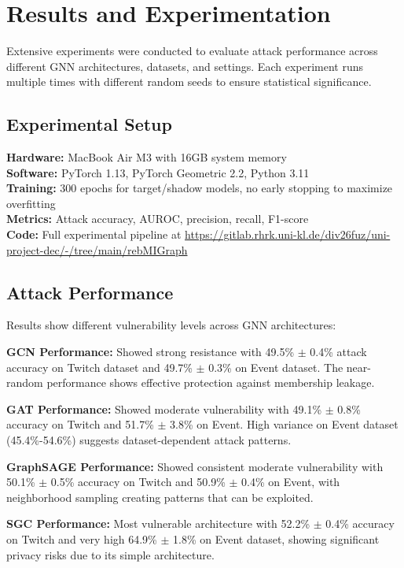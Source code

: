 \documentclass{article}
\begin{document}
\section{Results and Experimentation}
\label{results}
Extensive experiments were conducted to evaluate attack performance across different GNN architectures, datasets, and settings. Each experiment runs multiple times with different random seeds to ensure statistical significance.

\subsection{Experimental Setup}
\textbf{Hardware:} MacBook Air M3 with 16GB system memory\\
\textbf{Software:} PyTorch 1.13, PyTorch Geometric 2.2, Python 3.11\\
\textbf{Training:} 300 epochs for target/shadow models, no early stopping to maximize overfitting\\
\textbf{Metrics:} Attack accuracy, AUROC, precision, recall, F1-score\\
\textbf{Code:} Full experimental pipeline at \url{https://gitlab.rhrk.uni-kl.de/div26fuz/uni-project-dec/-/tree/main/rebMIGraph}

\subsection{Attack Performance}
Results show different vulnerability levels across GNN architectures:

\textbf{GCN Performance:} Showed strong resistance with 49.5\% $\pm$ 0.4\% attack accuracy on Twitch dataset and 49.7\% $\pm$ 0.3\% on Event dataset. The near-random performance shows effective protection against membership leakage.

\textbf{GAT Performance:} Showed moderate vulnerability with 49.1\% $\pm$ 0.8\% accuracy on Twitch and 51.7\% $\pm$ 3.8\% on Event. High variance on Event dataset (45.4\%-54.6\%) suggests dataset-dependent attack patterns.

\textbf{GraphSAGE Performance:} Showed consistent moderate vulnerability with 50.1\% $\pm$ 0.5\% accuracy on Twitch and 50.9\% $\pm$ 0.4\% on Event, with neighborhood sampling creating patterns that can be exploited.

\textbf{SGC Performance:} Most vulnerable architecture with 52.2\% $\pm$ 0.4\% accuracy on Twitch and very high 64.9\% $\pm$ 1.8\% on Event dataset, showing significant privacy risks due to its simple architecture.
\end{document}
